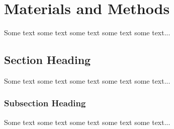 \chapter{Materials and Methods}
\label{methods}



Some text some text some text some text some text...


\section{Section Heading}

Some text some text some text some text some text...

  
\subsection{Subsection Heading}

Some text some text some text some text some text...